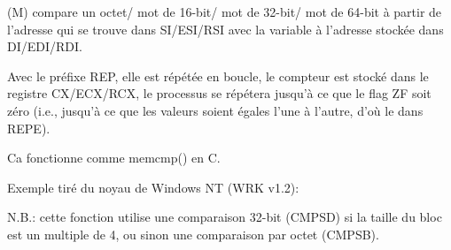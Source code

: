 \item[CMPSB/CMPSW/CMPSD/CMPSQ] (M) compare un octet/
mot de 16-bit/
mot de 32-bit/
mot de 64-bit
à partir de l'adresse qui se trouve dans SI/ESI/RSI avec la variable à l'adresse
stockée dans DI/EDI/RDI.

\label{REPE_CMPSx}
Avec le préfixe REP, elle est répétée en boucle, le compteur est stocké dans le registre
CX/ECX/RCX, le processus se répétera jusqu'à ce que le flag ZF soit zéro (i.e., jusqu'à
ce que les valeurs soient égales l'une à l'autre, d'où le  dans REPE).

Ca fonctionne comme memcmp() en C.

Exemple tiré du noyau de Windows NT (\ac{WRK} v1.2):



N.B.: cette fonction utilise une comparaison 32-bit (CMPSD) si la taille du bloc
est un multiple de 4, ou sinon une comparaison par octet (CMPSB).

